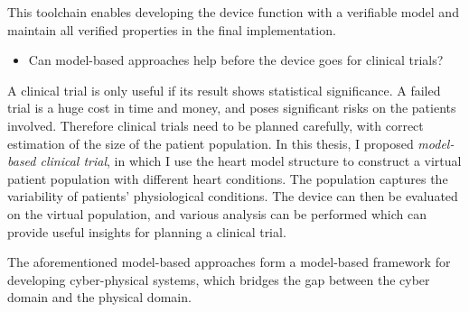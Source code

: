 \documentclass[a4paper]{article}
\begin{document}
This toolchain enables developing the device function with a verifiable model and maintain all verified properties in the final implementation.
\begin{itemize}
	\item Can model-based approaches help before the device goes for clinical trials?
\end{itemize}
A clinical trial is only useful if its result shows statistical significance.
A failed trial is a huge cost in time and money, and poses significant risks on the patients involved.
Therefore clinical trials need to be planned carefully, with correct estimation of the size of the patient population.
In this thesis, I proposed  \emph{model-based clinical trial}, in which I use the heart model structure to construct a virtual patient population with different heart conditions.
The population captures the variability of patients' physiological conditions.
The device can then be evaluated on the virtual population, and various analysis can be performed which can provide useful insights for planning a clinical trial.

The aforementioned model-based approaches form a model-based framework for developing cyber-physical systems, which bridges the gap between the cyber domain and the physical domain.
\end{document}
